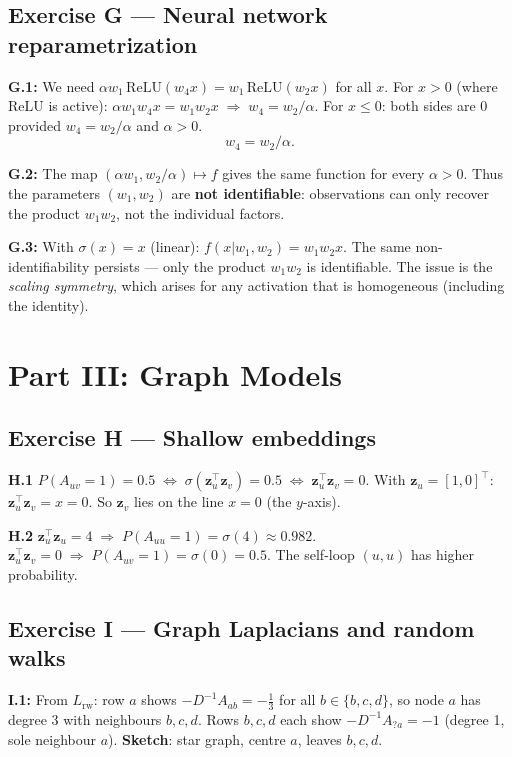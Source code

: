\documentclass[12pt,a4paper]{article}
\newcommand{\ans}[1]{\tcbox[colback=yellow!20,colframe=orange!60,size=small]{\textbf{#1}}}
\begin{document}
\subsection*{Exercise G --- Neural network reparametrization}

\textbf{G.1:} We need $\alpha w_1\,\mathrm{ReLU}(w_4 x)=w_1\,\mathrm{ReLU}(w_2 x)$ for all $x$.
For $x>0$ (where $\mathrm{ReLU}$ is active):
$\alpha w_1 w_4 x = w_1 w_2 x\;\Rightarrow\; w_4=w_2/\alpha$.
For $x\le 0$: both sides are 0 provided $w_4=w_2/\alpha$ and $\alpha>0$.
\[
  \boxed{w_4=w_2/\alpha.}
\]

\textbf{G.2:} The map $(\alpha w_1, w_2/\alpha)\mapsto f$ gives the same function for every $\alpha>0$.
Thus the parameters $(w_1,w_2)$ are \textbf{not identifiable}: observations can only recover the
product $w_1 w_2$, not the individual factors.

\textbf{G.3:} With $\sigma(x)=x$ (linear): $f(x|w_1,w_2)=w_1 w_2 x$.  The same non-identifiability
persists --- only the product $w_1 w_2$ is identifiable.  The issue is the \emph{scaling symmetry},
which arises for any activation that is homogeneous (including the identity).

\newpage
\section*{Part III: Graph Models}

\subsection*{Exercise H --- Shallow embeddings}

\textbf{H.1 \hfill \ans{Answer: A}}
$P(A_{uv}=1)=0.5\;\Leftrightarrow\;\sigma(\mathbf{z}_u^\top\mathbf{z}_v)=0.5\;\Leftrightarrow\;\mathbf{z}_u^\top\mathbf{z}_v=0$.
With $\mathbf{z}_u=[1,0]^\top$: $\mathbf{z}_u^\top\mathbf{z}_v=x=0$.  So $\mathbf{z}_v$ lies on the line $x=0$ (the $y$-axis).

\textbf{H.2 \hfill \ans{Answer: A}}
$\mathbf{z}_u^\top\mathbf{z}_u=4\;\Rightarrow\; P(A_{uu}=1)=\sigma(4)\approx 0.982$.
$\mathbf{z}_u^\top\mathbf{z}_v=0\;\Rightarrow\; P(A_{uv}=1)=\sigma(0)=0.5$.
The self-loop $(u,u)$ has higher probability.

\subsection*{Exercise I --- Graph Laplacians and random walks}

\textbf{I.1:} From $L_{\mathrm{rw}}$: row $a$ shows $-D^{-1}A_{ab}=-\frac{1}{3}$ for all $b\in\{b,c,d\}$, so node $a$ has degree 3 with neighbours $b,c,d$.
Rows $b,c,d$ each show $-D^{-1}A_{?a}=-1$ (degree 1, sole neighbour $a$).
\textbf{Sketch}: star graph, centre $a$, leaves $b,c,d$.
\end{document}
